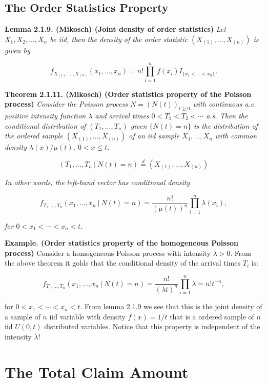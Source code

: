 \documentclass[a4paper,10pt,openany]{book}
\begin{document}
\hypertarget{the-order-statistics-property}{%
\subsection{The Order Statistics Property}\label{the-order-statistics-property}}

\textbf{Lemma 2.1.9. (Mikosch) (Joint density of order statistics)} \emph{Let \(X_1,X_2,...,X_n\) be iid, then the density of the order statistic \((X_{(1)},...,X_{(n)})\) is given by}

\[
f_{X_{(1)},...,X_{(n)}}(x_1,...,x_n)=n!\prod_{i=1}^n f(x_i)I_{\{x_1<\cdots <x_n\}}.
\]

\textbf{Theorem 2.1.11. (Mikosch) (Order statistics property of the Poisson process)} \emph{Consider the Poisson process \(N = (N(t))_{t\ge 0}\) with continuous a.e. positive intensity function \(\lambda\) and arrival times \(0 < T_1 < T_2 < \cdots\) a.s. Then the conditional distribution of \((T_1 ,..., T_n )\) given \(\{N (t) = n\}\) is the distribution of the ordered sample \((X_{(1)}, ... , X_{(n)})\) of an iid sample \(X_1,..., X_n\) with common density \(\lambda(x)/\mu(t)\), \(0 < x \le t\):}

\[
(T_1,...,T_n\ \vert\ N(t)=n)\stackrel{d}{=}(X_{(1)},...,X_{(n)})
\]

\emph{In other words, the left-hand vector has conditional density}

\[
f_{T_1,...,T_n}(x_1,...,x_n\ \vert\ N(t)=n)=\frac{n!}{(\mu(t))^n}\prod_{i=1}^n\lambda(x_i),
\]

\emph{for \(0<x_1<\cdots < x_n<t\).}

\textbf{Example. (Order statistics property of the homogeneous Poisson process)} Consider a homogeneous Poisson process with intensity \(\lambda> 0\). From the above theorem it golds that the conditional density of the arrival times \(T_i\) is:

\[
f_{T_1,...,T_n}(x_1,...,x_n\ \vert\ N(t)=n)=\frac{n!}{(\lambda t)^n}\prod_{i=1}^n\lambda=n!t^{-n},
\]

for \(0<x_1<\cdots < x_n<t\). From lemma 2.1.9 we see that this is the joint density of a sample of \(n\) iid variable with density \(f(x)=1/t\) that is a ordered sample of \(n\) iid \(U(0,t)\) distributed variables. Notice that this property is independent of the intensity \(\lambda\)!

\hypertarget{the-total-claim-amount}{%
\section{The Total Claim Amount}\label{the-total-claim-amount}}
\end{document}
